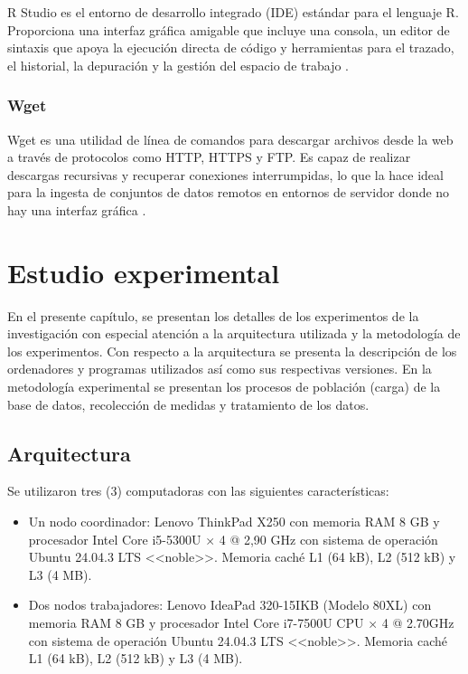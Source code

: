 \documentclass[12pt, letter paper]{report}
\begin{document}
        R Studio es el entorno de desarrollo integrado (IDE) estándar para el
        lenguaje R. Proporciona una interfaz gráfica amigable que incluye una
        consola, un editor de sintaxis que apoya la ejecución directa de código
        y herramientas para el trazado, el historial, la depuración y la gestión
        del espacio de trabajo \cite{rstudio_ide}.

      \subsection{Wget} %
      \label{sub:wget}
        Wget es una utilidad de línea de comandos para descargar archivos desde
        la web a través de protocolos como HTTP, HTTPS y FTP. Es capaz de
        realizar descargas recursivas y recuperar conexiones interrumpidas, lo
        que la hace ideal para la ingesta de conjuntos de datos remotos en
        entornos de servidor donde no hay una interfaz gráfica
        \cite{wget_manual}.

  \chapter{Estudio experimental} %
  \label{cha:estudio_experimental}
    En el presente capítulo, se presentan los detalles de los experimentos de la
    investigación con especial atención a la arquitectura utilizada y la
    metodología de los experimentos. Con respecto a la arquitectura se presenta
    la descripción de los ordenadores y programas utilizados así como sus
    respectivas versiones. En la metodología experimental se presentan los
    procesos de población (carga) de la base de
    datos, recolección de medidas y tratamiento de los datos.

    \section{Arquitectura} %
    \label{sec:arquitectura}
      Se utilizaron tres (3) computadoras con las siguientes características:

      \begin{itemize}
        \item Un nodo coordinador: Lenovo ThinkPad X250 con memoria RAM 8 GB y
        procesador Intel Core i5-5300U × 4 @ 2,90 GHz con sistema de operación
        Ubuntu 24.04.3 LTS <<noble>>. Memoria caché L1 (64 kB), L2 (512 kB) y L3
        (4 MB).
        \item Dos nodos trabajadores: Lenovo IdeaPad 320-15IKB (Modelo 80XL) con
        memoria RAM 8 GB y procesador Intel Core i7-7500U CPU × 4 @ 2.70GHz con
        sistema de operación Ubuntu 24.04.3 LTS <<noble>>. Memoria caché L1 (64
        kB), L2 (512 kB) y L3 (4 MB).
      \end{itemize}
\end{document}
